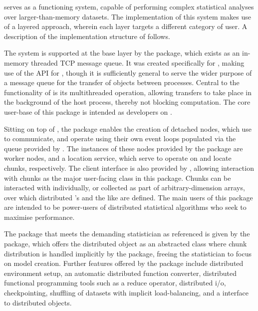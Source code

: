 \lsr{} serves as a functioning system, capable of performing complex statistical analyses over larger-than-memory datasets.
The implementation of this system makes use of a layered approach, wherein each layer targets a different category of user.
A description of the implementation structure of \lsr{} follows.

The system is supported at the base layer by the  package, which exists as an in-memory threaded TCP message queue.
It was created specifically for , making use of the  API for \R{}, though it is sufficiently general to serve the wider purpose of a message queue for the transfer of \R{} objects between \R{} processes.
Central to the functionality of  is its multithreaded operation, allowing transfers to take place in the background of the host \R{} process, thereby not blocking computation.
The core user-base of this package is intended as developers on \lsr{}.

Sitting on top of , the package  enables the creation of detached nodes, which use  to communicate, and operate using their own event loops populated via the queue provided by .
The instances of these nodes provided by the package are worker nodes, and a location service, which serve to operate on and locate chunks, respectively.
The client interface is also provided by , allowing interaction with chunks as the major user-facing class in this package.
Chunks can be interacted with individually, or collected as part of arbitrary-dimension arrays, over which distributed 's and the like are defined.
The main users of this package are intended to be power-users of distributed statistical algorithms who seek to maximise performance.

The package that meets the demanding statistician as referenced is given by the \lsr{} package, which offers the distributed object as an abstracted class where chunk distribution is handled implicitly by the package, freeing the statistician to focus on model creation. Further features offered by the package include distributed environment setup, an automatic distributed function converter, distributed functional programming tools such as a reduce operator, distributed i/o, checkpointing, shuffling of datasets with implicit load-balancing, and a  interface to distributed objects.
